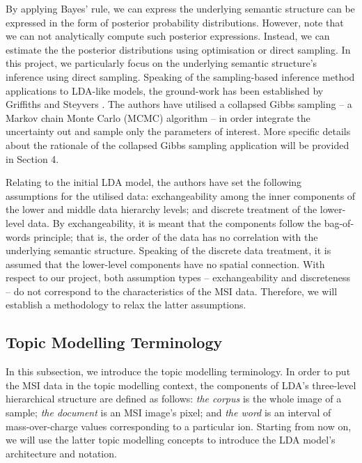\documentclass{mpaper}
\begin{document}
\par By applying Bayes' rule, we can express the underlying semantic structure can be expressed in the form of posterior probability distributions. However, note that we can not analytically compute such posterior expressions. Instead, we can estimate the the posterior distributions using optimisation or direct sampling. In this project, we particularly focus on the underlying semantic structure's inference using direct sampling. Speaking of the sampling-based inference method applications to LDA-like models, the ground-work has been established by Griffiths and Steyvers \cite{griffiths2004finding}. The authors have utilised a collapsed Gibbs sampling -- a Markov chain Monte Carlo (MCMC) algorithm -- in order integrate the uncertainty out and sample only the parameters of interest. More specific details about the rationale of the collapsed Gibbs sampling application will be provided in Section 4. 

\par Relating to the initial LDA model, the authors have set the following assumptions for the utilised data: exchangeability among the inner components of the lower and middle data hierarchy levels; and discrete treatment of the lower-level data. By exchangeability, it is meant that the components follow the bag-of-words principle; that is, the order of the data has no correlation with the underlying semantic structure. Speaking of the discrete data treatment, it is assumed that the lower-level components have no spatial connection. With respect to our project, both assumption types -- exchangeability and discreteness -- do not correspond to the characteristics of the MSI data. Therefore, we will establish a methodology to relax the latter assumptions.

\subsection{Topic Modelling Terminology}

\par In this subsection, we introduce the topic modelling terminology. In order to put the MSI data in the topic modelling context, the components of  LDA's three-level hierarchical structure are defined as follows: \textit{the corpus} is the whole image of a sample; \textit{the document} is an MSI image's pixel; and \textit{the word} is an interval of mass-over-charge values corresponding to a particular ion. Starting from now on, we will use the latter topic modelling concepts to introduce the LDA model's architecture and notation.
\end{document}
